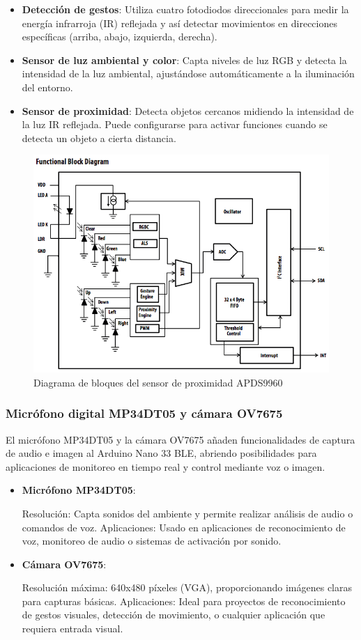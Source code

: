 \documentclass[12pt,a4paper]{article}
\begin{document}
\begin{itemize}
    \item \textbf{Detección de gestos}: Utiliza cuatro fotodiodos direccionales para medir la energía infrarroja (IR) reflejada y así detectar movimientos en direcciones específicas (arriba, abajo, izquierda, derecha).
    \item \textbf{Sensor de luz ambiental y color}: Capta niveles de luz RGB y detecta la intensidad de la luz ambiental, ajustándose automáticamente a la iluminación del entorno.
    \item \textbf{Sensor de proximidad}: Detecta objetos cercanos midiendo la intensidad de la luz IR reflejada. Puede configurarse para activar funciones cuando se detecta un objeto a cierta distancia.
\end{itemize}

\begin{figure}[H]
    \centering
    \includegraphics[width=0.6\linewidth]{Imagenes/A_BD.png}
    \caption{Diagrama de bloques del sensor de proximidad APDS9960 \cite{sensor}}
    \label{fig:4}
\end{figure}

\subsubsection{Micrófono digital MP34DT05 y cámara OV7675}
El micrófono MP34DT05 \cite{micro} y la cámara OV7675 \cite{cam} añaden funcionalidades de captura de audio e imagen al Arduino Nano 33 BLE, abriendo posibilidades para aplicaciones de monitoreo en tiempo real y control mediante voz o imagen.

\begin{itemize}
    \item \textbf{Micrófono MP34DT05}:

        \subitem Resolución: Capta sonidos del ambiente y permite realizar análisis de audio o comandos de voz.
        \subitem Aplicaciones: Usado en aplicaciones de reconocimiento de voz, monitoreo de audio o sistemas de activación por sonido.
  
    \item \textbf{Cámara OV7675}:
   
        \subitem Resolución máxima: 640x480 píxeles (VGA), proporcionando imágenes claras para capturas básicas.
        \subitem Aplicaciones: Ideal para proyectos de reconocimiento de gestos visuales, detección de movimiento, o cualquier aplicación que requiera entrada visual.

\end{itemize}
\end{document}
